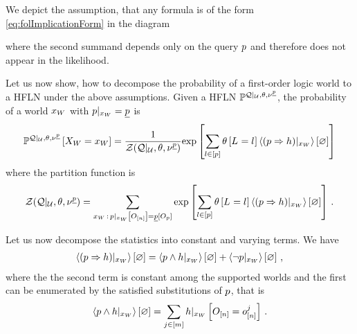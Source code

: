 We depict the assumption, that any formula is of the form \eqref{eq:folImplicationForm} in the diagram
\begin{center}
    
\end{center}
where the second summand depends only on the query $p$ and therefore does not appear in the likelihood.




Let us now show, how to decompose the probability of a first-order logic world to a HFLN under the above assumptions.
Given a HFLN $\mathbb{P}^{{\mathcal{Q}}|_{\mathcal{U}},\theta,\nu^{\underline{p}}}$, the probability of a world $x_{W}$ with ${p}|_{x_{W}}=\underline{p}$ is %
\begin{align*}
    \mathbb{P}^{{\mathcal{Q}}|_{\mathcal{U}},\theta,\nu^{\underline{p}}}\left[X_{W}=x_{W}\right]
    = \frac{1}{\mathcal{Z}{\left({\mathcal{Q}}|_{\mathcal{U}},\theta,\nu^{\underline{p}}\right)}}
    \mathrm{exp}\left[\sum_{l\in[p]}\theta\left[L_{}=l_{}\right]\left\langle {(p\Rightarrow h)}|_{x_{W}}\right\rangle \left[ \varnothing \right]\right]
\end{align*}
where the partition function is
\begin{align*}
    \mathcal{Z}{\left({\mathcal{Q}}|_{\mathcal{U}},\theta,\nu^{\underline{p}}\right)} =
    \sum_{x_{W} \, : \, {p}|_{x_{W}} \left[O_{[n]}\right] = \underline{p}\left[O_{p}\right]}
    \mathrm{exp}\left[\sum_{l\in[p]}\theta\left[L_{}=l_{}\right]\left\langle {(p\Rightarrow h)}|_{x_{W}}\right\rangle \left[ \varnothing \right]\right] \, .
\end{align*}


Let us now decompose the statistics into constant and varying terms.
We have
\begin{align*}
    \left\langle {(p\Rightarrow h)}|_{x_{W}}\right\rangle \left[ \varnothing \right] =
    \left\langle {p\land h}|_{x_{W}}\right\rangle \left[ \varnothing \right] + \left\langle {\lnot p}|_{x_{W}}\right\rangle \left[ \varnothing \right] \, ,
\end{align*}
where the the second term is constant among the supported worlds and the first can be enumerated by the satisfied substitutions of $p$, that is
\begin{align*}
    \left\langle {p\land h}|_{x_{W}}\right\rangle \left[ \varnothing \right]
    = \sum_{j\in[m]}{h}|_{x_{W}} \left[O_{[n]} = o_{[n]}^{j}\right] \, .
\end{align*}


